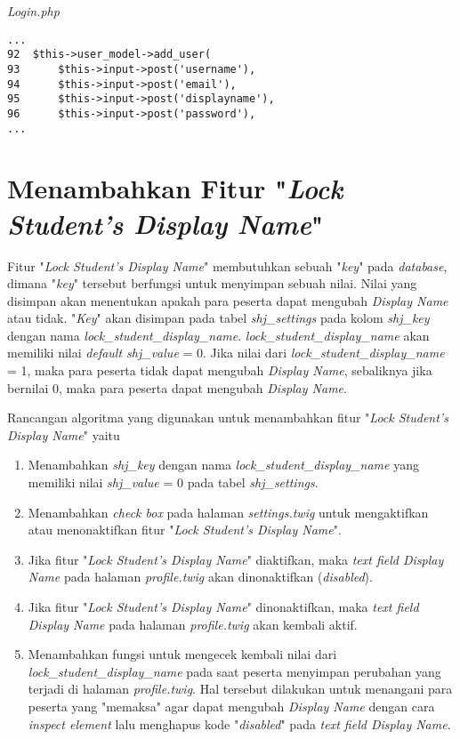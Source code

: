 \textit{Login.php}
\begin{lstlisting}[basicstyle=\ttfamily, frame=single,
columns=fullflexible, keepspaces=true, breaklines=true]
...
92	$this->user_model->add_user(
93		$this->input->post('username'),
94		$this->input->post('email'),
95		$this->input->post('displayname'),
96		$this->input->post('password'),
...
\end{lstlisting}

\section{Menambahkan Fitur "\textit{Lock Student's Display Name}"}
Fitur "\textit{Lock Student's Display Name}" membutuhkan sebuah "\textit{key}" pada \textit{database}, dimana "\textit{key}" tersebut berfungsi untuk menyimpan sebuah nilai. Nilai yang disimpan akan menentukan apakah para peserta dapat mengubah \textit{Display Name} atau tidak. "\textit{Key}" akan disimpan pada tabel \textit{shj\_settings} pada kolom \textit{shj\_key} dengan nama \textit{lock\_student\_display\_name}. \textit{lock\_student\_display\_name} akan memiliki nilai \textit{default shj\_value} = 0. Jika nilai dari \textit{lock\_student\_display\_name} = 1, maka para peserta tidak dapat mengubah \textit{Display Name}, sebaliknya jika bernilai 0, maka para peserta dapat mengubah \textit{Display Name}.

Rancangan algoritma yang digunakan untuk menambahkan fitur "\textit{Lock Student's Display Name}" yaitu
\begin{enumerate}
	\item Menambahkan \textit{shj\_key} dengan nama \textit{lock\_student\_display\_name} yang memiliki nilai \textit{shj\_value} = 0 pada tabel \textit{shj\_settings}.
	\item Menambahkan \textit{check box} pada halaman \textit{settings.twig} untuk mengaktifkan atau menonaktifkan fitur "\textit{Lock Student's Display Name}".
	\item Jika fitur "\textit{Lock Student's Display Name}" diaktifkan, maka \textit{text field Display Name} pada halaman \textit{profile.twig} akan dinonaktifkan (\textit{disabled}).
	\item Jika fitur "\textit{Lock Student's Display Name}" dinonaktifkan, maka \textit{text field Display Name} pada halaman \textit{profile.twig} akan kembali aktif.
	\item Menambahkan fungsi untuk mengecek kembali nilai dari \textit{lock\_student\_display\_name} pada saat peserta menyimpan perubahan yang terjadi di halaman \textit{profile.twig}. Hal tersebut dilakukan untuk menangani para peserta yang "memaksa" agar dapat mengubah \textit{Display Name} dengan cara \textit{inspect element} lalu menghapus kode "\textit{disabled}" pada \textit{text field Display Name}.
\end{enumerate}

